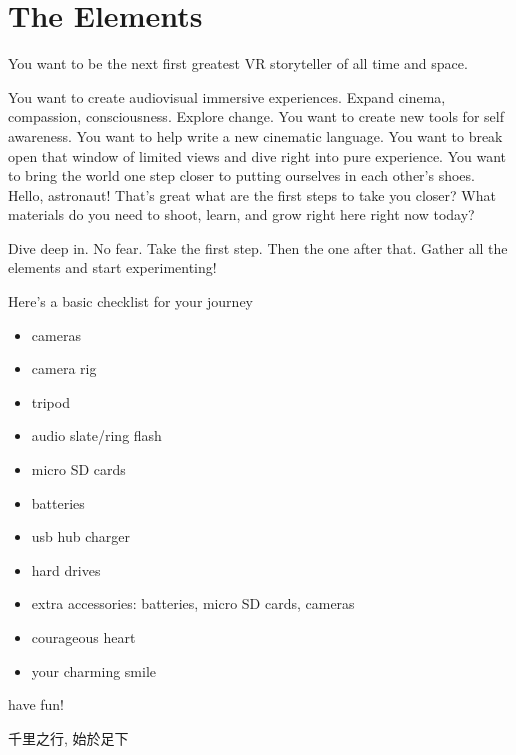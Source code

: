 \chapter{The Elements}
\pagecolor{white}
\label{chap:1}
\begin{fullwidth}

\problem

{\large You want to be the next first greatest VR storyteller of all time and space. \par}

You want to create audiovisual immersive experiences. Expand cinema, compassion, consciousness. Explore change. You want to create new tools for self awareness. You want to help write a new cinematic language. You want to break open that window of limited views and dive right into pure experience. You want to bring the world one step closer to putting ourselves in each other’s shoes. Hello, astronaut! That’s great what are the first steps to take you closer? What materials do you need to shoot, learn, and grow right here right now today?

\solution

{\large Dive deep in. No fear. Take the first step. Then the one after that. Gather all the elements and start experimenting! \par}

Here’s a basic checklist for your journey

\begin{itemize}
\item cameras
\item camera rig
\item tripod
\item audio slate/ring flash
\item micro SD cards
\item batteries
\item usb hub charger
\item hard drives
\item extra accessories: batteries, micro SD cards, cameras
\item courageous heart
\item your charming smile
\end{itemize}
                
have fun!

\begin{CJK*}{UTF8}{gbsn}
千里之行, 始於足下
\clearpage\end{CJK*}

\clearpage
\end{fullwidth}